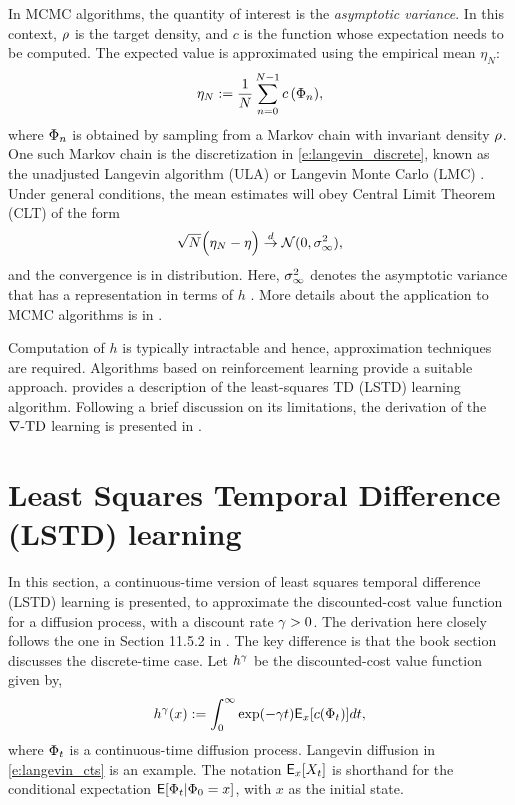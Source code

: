 In MCMC algorithms, the quantity of interest is the \textit{asymptotic variance}. In this context, $\rho$ is the target density, and $c$ is the function whose expectation needs to be computed. The expected value is approximated using the empirical mean $\eta_N$:
\[ \eta_N := \frac{1}{N} \sum_{n=0}^{N-1} c\,(\Phi_n),\]
where $\Phi_n$ is obtained by sampling from a Markov chain with invariant density $\rho$. One such Markov chain is the discretization in \eqref{e:langevin_discrete}, known as the unadjusted Langevin algorithm (ULA) or Langevin Monte Carlo (LMC) \cite{}. Under general conditions, the mean estimates will obey Central Limit Theorem (CLT) of the form
\[
\sqrt{N} \Bigl( \eta_N - \eta \Bigr) \overset{d}{\to} \mathcal{N}(0,\sigma_\infty ^2),
\]
and the convergence is in distribution. Here, $\sigma_\infty^2$ denotes the asymptotic variance that has a representation in terms of $h$ \cite{glymey96a,MT,asmgly07}. More details about the application to MCMC algorithms is in \Chapter{}. 

Computation of $h$ is typically intractable and hence, approximation techniques are required. Algorithms based on reinforcement learning provide a suitable approach.  provides a description of the least-squares TD (LSTD) learning algorithm. Following a brief discussion on its limitations,  the derivation of the $\nabla\text{-TD}$ learning is presented in . 

\section{Least Squares Temporal Difference (LSTD) learning} 
In this section, a continuous-time version of least squares temporal difference (LSTD) learning is presented, to approximate the discounted-cost value function for a diffusion process, with a discount rate $\gamma  >0$. The derivation here closely follows the one in Section 11.5.2 in \cite{ctcn}. The key difference is that the book section discusses the discrete-time case. Let $h^\gamma$ be the discounted-cost value function given by,
\begin{equation}
h^\discount(x) := \int_0^\infty \exp(-\discount t )\Expect_x[c(\markovstate_t)] dt, 
\label{e:discount_value_fn}
\end{equation}
where $\Phi_t$ is a continuous-time diffusion process. Langevin diffusion in \eqref{e:langevin_cts} is an example. The notation ${\sf E}_x[X_t]$ is shorthand for the conditional expectation ${\sf E}[\Phi_t|\Phi_0 = x]$, with $x$ as the initial state. 

